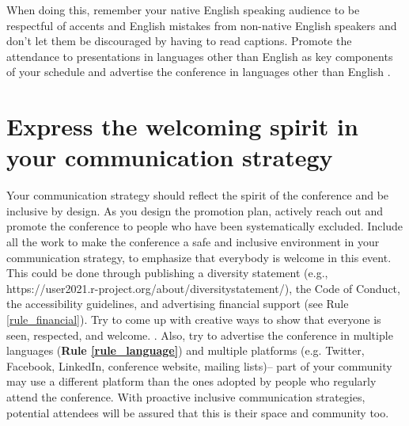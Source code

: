 \documentclass[10pt,letterpaper]{article}
\begin{document}
When doing this, remember your native English speaking audience to be respectful of accents and English mistakes from non-native English speakers and don't let them be discouraged by having to read captions. 
Promote the attendance to presentations in languages other than English as key components of your schedule and advertise the conference in languages other than English . 




\section{Express the welcoming spirit in your communication strategy}
\label{rule_communication}

Your communication strategy should reflect the spirit of the conference and be inclusive by design. 
As you design the promotion plan, actively reach out and promote the conference to people who have been systematically excluded. 
Include all the work to make the conference a safe and inclusive environment in your communication strategy, 
to emphasize that everybody is welcome in this event. This could be done through publishing a diversity statement (e.g., https://user2021.r-project.org/about/diversitystatement/), the Code of Conduct, the accessibility guidelines, and advertising financial support (see Rule \ref{rule_financial}). Try to come up with creative ways to show that everyone is seen, respected, and welcome. .
Also, try to advertise the conference in multiple languages (\textbf{Rule \ref{rule_language}}) and multiple platforms (e.g. Twitter, Facebook, LinkedIn, conference website, mailing lists)--
part of your community may use a different platform than the ones adopted by people who regularly attend the conference. 
With proactive inclusive communication strategies, potential attendees will be assured that this is their space and community too.
\end{document}
